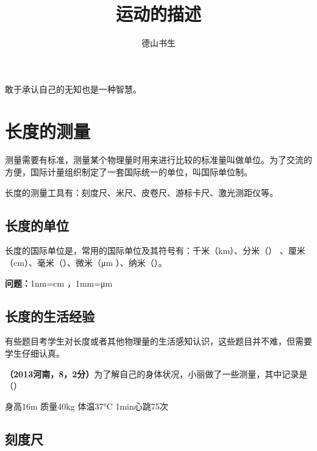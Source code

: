 \documentclass[12pt,twoside]{exam}
\begin{document}
\begin{coverpages}
\title{运动的描述}
\author{德山书生}
\maketitle
\tableofcontents
\end{coverpages}
\begin{knowledge}
\begin{flushright}
\begin{notecard}{16em}
\ttfamily 
敢于承认自己的无知也是一种智慧。
\end{notecard}
\end{flushright}
\section{长度的测量}
测量需要有标准，测量某个物理量时用来进行比较的标准量叫做单位。为了交流的方便，国际计量组织制定了一套国际统一的单位，叫国际单位制。

长度的测量工具有：刻度尺、米尺、皮卷尺、游标卡尺、激光测距仪等。

\subsection{长度的单位}
长度的国际单位是\answerline*[米]，常用的国际单位及其符号有：千米（km）、分米（\answerline*[dm]） 、厘米（cm）、毫米（\answerline*[mm]）、微米（\si{\micro m}
）、纳米（\answerline*[nm]）。


\textbf{问题：}1nm=\answerline*[\num{d7}]\si{cm} ，1mm=\answerline*[\num{d3}]\si{\micro m}

\subsection{长度的生活经验}
有些题目考学生对长度或者其他物理量的生活感知认识，这些题目并不难，但需要学生仔细认真。

\textbf{（2013河南，8，2分）}为了解自己的身体状况，小丽做了一些测量，其中记录是（\answerline*[A]）

\begin{oneparchoices}
\choice 身高16m
\choice 质量40kg
\choice 体温37\si{\degreeCelsius}
\choice 1min心跳75次
\end{oneparchoices}


\subsection{刻度尺}

\end{knowledge}
\end{document}
